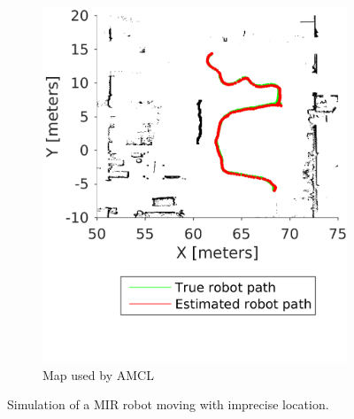 \begin{figure}
	~ %
	\begin{subfigure}[b]{0.45\textwidth}
		\includegraphics[width=\textwidth]{figures/static_mapping/simulated_robot_estimate_total_edited}
		\caption{Map used by AMCL}
		\label{fig:simulated_robot_estimate_total_edited}
	\end{subfigure}
	\caption{Simulation of a MIR robot moving with imprecise location.}
	\label{fig:animals}
\end{figure}

